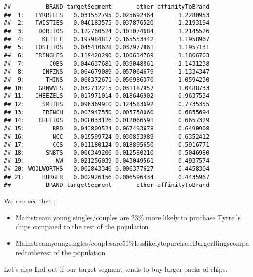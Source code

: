\documentclass[]{article}
\providecommand{\tightlist}{%
  \setlength{\itemsep}{0pt}\setlength{\parskip}{0pt}}
\begin{document}
\begin{verbatim}
##          BRAND targetSegment       other affinityToBrand
##  1:   TYRRELLS   0.031552795 0.025692464       1.2280953
##  2:   TWISTIES   0.046183575 0.037876520       1.2193194
##  3:    DORITOS   0.122760524 0.101074684       1.2145526
##  4:     KETTLE   0.197984817 0.165553442       1.1958967
##  5:   TOSTITOS   0.045410628 0.037977861       1.1957131
##  6:   PRINGLES   0.119420290 0.100634769       1.1866703
##  7:       COBS   0.044637681 0.039048861       1.1431238
##  8:     INFZNS   0.064679089 0.057064679       1.1334347
##  9:      THINS   0.060372671 0.056986370       1.0594230
## 10:    GRNWVES   0.032712215 0.031187957       1.0488733
## 11:   CHEEZELS   0.017971014 0.018646902       0.9637534
## 12:     SMITHS   0.096369910 0.124583692       0.7735355
## 13:     FRENCH   0.003947550 0.005758060       0.6855694
## 14:    CHEETOS   0.008033126 0.012066591       0.6657329
## 15:        RRD   0.043809524 0.067493678       0.6490908
## 16:        NCC   0.019599724 0.030853989       0.6352412
## 17:        CCS   0.011180124 0.018895650       0.5916771
## 18:      SNBTS   0.006349206 0.012580210       0.5046980
## 19:         WW   0.021256039 0.043049561       0.4937574
## 20: WOOLWORTHS   0.002843340 0.006377627       0.4458304
## 21:     BURGER   0.002926156 0.006596434       0.4435967
##          BRAND targetSegment       other affinityToBrand
\end{verbatim}

We can see that :

\begin{itemize}
\tightlist
\item
  Mainstream young singles/couples are 23\% more likely to purchase
  Tyrrells chips compared to the rest of the population
\item
  Mainstreamyoungsingles/couplesare56\%lesslikelytopurchaseBurgerRingscomparedtotherest
  of the population
\end{itemize}

Let's also find out if our target segment tends to buy larger packs of
chips.
\end{document}
